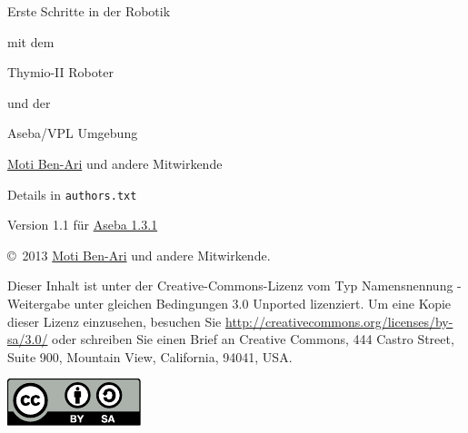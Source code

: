 \thispagestyle{empty}

\begin{center}
\begin{Huge}
\begin{bfseries}
Erste Schritte in der Robotik
\end{bfseries}

mit dem 

\begin{bfseries}
Thymio-II Roboter
\end{bfseries}

und der

\begin{bfseries}
Aseba/VPL Umgebung
\end{bfseries}

\end{Huge}

\vskip 2cm


\begin{LARGE}
\href{http://www.weizmann.ac.il/sci-tea/benari/}{Moti Ben-Ari} und andere Mitwirkende\\
\end{LARGE}
\bigskip
\begin{Large}
Details in \texttt{authors.txt} 
\end{Large}

\vskip 1cm

\begin{Large}
Version 1.1 für \href{https://aseba.wikidot.com/de:downloadinstall}{Aseba 1.3.1}
\end{Large}

\end{center}

\vfill

\begin{center}
\copyright{}\  2013 \href{http://www.weizmann.ac.il/sci-tea/benari/}{Moti Ben-Ari} und andere Mitwirkende.
\end{center}

Dieser Inhalt ist unter der Creative-Commons-Lizenz vom Typ Namensnennung -
Weitergabe unter gleichen Bedingungen 3.0 Unported lizenziert.
Um eine Kopie dieser Lizenz einzusehen, besuchen Sie \url{http://creativecommons.org/licenses/by-sa/3.0/} oder schreiben Sie einen Brief an Creative Commons, 444 Castro Street, Suite 900, Mountain View, California, 94041, USA.

\begin{center}
\includegraphics[width=.2\textwidth]{../images/by-sa}
\end{center}

\tableofcontents
\thispagestyle{empty}
